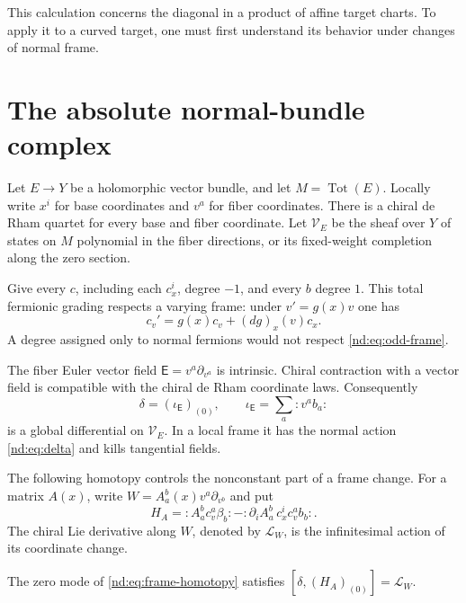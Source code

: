 This calculation concerns the diagonal in a product of affine target
charts. To apply it to a curved target, one must first understand its
behavior under changes of normal frame.

\section{The absolute normal-bundle complex}
\label{nd:sec:absolute}

Let $E\to Y$ be a holomorphic vector bundle, and let
$M=\operatorname{Tot}(E)$. Locally write $x^i$ for base coordinates
and $v^a$ for fiber coordinates. There is a chiral de Rham quartet
for every base and fiber coordinate. Let $\mathcal V_E$ be the sheaf
over $Y$ of states on $M$ polynomial in the fiber directions, or its
fixed-weight completion along the zero section.

Give every $c$, including each $c_x^i$, degree $-1$, and every $b$
degree $1$. This total fermionic grading respects a varying frame:
under $v'=g(x)v$ one has
\begin{equation}\label{nd:eq:odd-frame}
 c_v'=g(x)c_v+(dg)_x(v)c_x.
\end{equation}
A degree assigned only to normal fermions would not respect
\eqref{nd:eq:odd-frame}.

The fiber Euler vector field $\mathsf E=v^a\partial_{v^a}$ is
intrinsic. Chiral contraction with a vector field is compatible with
the chiral de Rham coordinate laws. Consequently
\begin{equation}\label{nd:eq:absolute-delta}
 \delta=(\iota_{\mathsf E})_{(0)},\qquad
 \iota_{\mathsf E}=\sum_a:v^ab_a:
\end{equation}
is a global differential on $\mathcal V_E$.
In a local frame it has the normal action
\eqref{nd:eq:delta} and kills tangential fields.

The following homotopy controls the nonconstant part of a frame change.
For a matrix $A(x)$, write $W=A^b_a(x)v^a\partial_{v^b}$ and put
\begin{equation}\label{nd:eq:frame-homotopy}
 H_A=:A^b_a c_v^a\beta_b:
       -:\partial_iA^b_a\,c_x^ic_v^ab_b:.
\end{equation}
The chiral Lie derivative along $W$, denoted by $\mathcal L_W$,
is the infinitesimal action of its coordinate change.

\begin{lemma}\label{nd:lem:frame}
The zero mode of \eqref{nd:eq:frame-homotopy} satisfies
$[\delta,(H_A)_{(0)}]=\mathcal L_W$.
\end{lemma}

